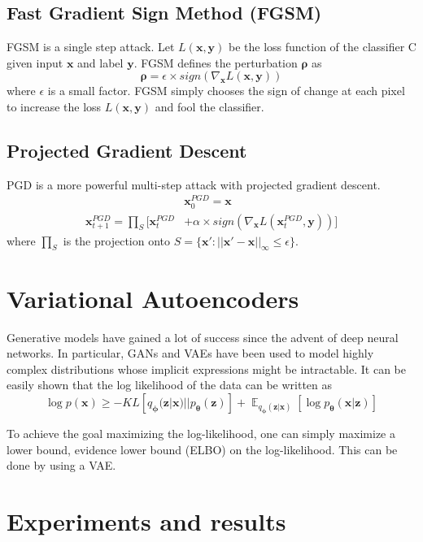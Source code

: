 \documentclass[journal]{IEEEtran}
\newcommand{\bx}{\bm{x}}
\newcommand{\by}{\bm{y}}
\newcommand{\bz}{\bm{z}}
\newcommand{\btheta}{\bm{\theta}}
\newcommand{\bphi}{\bm{\phi}}
\DeclareMathOperator{\expectation}{\mathbb{E}}
\begin{document}
\subsection{Fast Gradient Sign Method (FGSM)}
FGSM\cite{FGSM} is a single step attack. Let $L(\bx, \by)$ be the loss function of the classifier C given input $\bx$ and label $\by$. FGSM defines the perturbation $\bm{\rho}$ as
\begin{equation}
	\bm{\rho} = \epsilon \times sign(\nabla_{\bx} L(\bx, \by))
\end{equation}
where $\epsilon$ is a small factor. FGSM simply chooses the sign of change at each pixel to increase the loss $L(\bx, \by)$ and fool the classifier.

\subsection{Projected Gradient Descent}
PGD\cite{PGD} is a more powerful multi-step attack with projected gradient descent.
\begin{equation}
	\begin{aligned}
		& \bx_0^{PGD} = \bx
		\\
		\bx_{t+1}^{PGD} = \prod_S [\bx_t^{PGD} & + \alpha \times sign(\nabla_{\bx} L(\bx_t^{PGD}, \by))]
	\end{aligned}
\end{equation}
where $\prod_S$ is the projection onto $S = \{\bx' : ||\bx' - \bx||_{\infty} \leq \epsilon\}$.

\section{Variational Autoencoders}
Generative models have gained a lot of success since the advent of deep neural networks. In particular, GANs\cite{GAN} and VAEs\cite{VAE} have been used to model highly complex distributions whose implicit expressions might be intractable. It can be easily shown that the log likelihood of the data can be written as
\begin{equation}
	\log p(\bx) \geq -KL[q_{\bphi}(\bz | \bx) || p_{\btheta}(\bz)] + \expectation_{q_{\bphi}(\bz | \bx)}[\log p_{\btheta}(\bx | \bz)]
\end{equation}

To achieve the goal maximizing the log-likelihood, one can simply maximize a lower bound, evidence lower bound (ELBO) on the log-likelihood. This can be done by using a VAE.

\section{Experiments and results}
\end{document}
